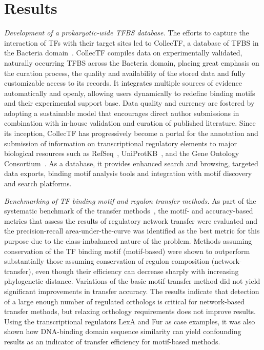 \section{Results}

\textit{Development of a prokaryotic-wide TFBS database.}  The efforts to
capture the interaction of TFs with their target sites led to CollecTF, a
database of TFBS in the Bacteria domain~\citep{kilic2013collectf,
  kilicc2016data}. CollecTF compiles data on experimentally validated,
naturally occurring TFBS across the Bacteria domain, placing great emphasis on
the curation process, the quality and availability of the stored data and fully
customizable access to its records. It integrates multiple sources of evidence
automatically and openly, allowing users dynamically to redefine binding motifs
and their experimental support base. Data quality and currency are fostered by
adopting a sustainable model that encourages direct author submissions in
combination with in-house validation and curation of published
literature. Since its inception, CollecTF has progressively become a portal for
the annotation and submission of information on transcriptional regulatory
elements to major biological resources such as RefSeq~\citep{o2015reference},
UniProtKB~\citep{uniprot2014uniprot}, and the Gene Ontology
Consortium~\citep{gene2013gene}. As a database, it provides enhanced search and
browsing, targeted data exports, binding motif analysis tools and integration
with motif discovery and search platforms.

\textit{Benchmarking of TF binding motif and regulon transfer methods.}  As
part of the systematic benchmark of the transfer
methods~\citep{kilic2015assessment}, the motif- and accuracy-based metrics that
assess the results of regulatory network transfer were evaluated and the
precision-recall area-under-the-curve was identified as the best metric for
this purpose due to the class-imbalanced nature of the problem. Methods
assuming conservation of the TF binding motif (motif-based) were shown to
outperform substantially those assuming conservation of regulon composition
(network-transfer), even though their efficiency can decrease sharply with
increasing phylogenetic distance. Variations of the basic motif-transfer method
did not yield significant improvements in transfer accuracy. The results
indicate that detection of a large enough number of regulated orthologs is
critical for network-based transfer methods, but relaxing orthology
requirements does not improve results. Using the transcriptional regulators
LexA and Fur as case examples, it was also shown how DNA-binding domain
sequence similarity can yield confounding results as an indicator of transfer
efficiency for motif-based methods.

